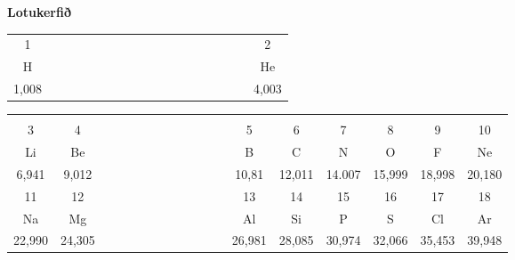 \documentclass[border=1pt,tikz,landscape]{standalone}
\begin{document}
\thispagestyle{empty}
\Large
\begin{center}
\textcolor[rgb]{0.15,0.15,0.55}{{\huge \bf \sc \hspace{-1cm} Lotukerfið}\\[-0.3cm]}
\begin{tabular}{|c|p{10.7mm}*{14}{p{9.86mm}}p{12.2mm}|c|}
\cline{1-1}\cline{18-18}
{\small 1} &&&&&&&&&&&&&&&&& \small 2\\[-1mm]
H &&&&&&&&&&&&&&&&& He\\[-2mm]
\small \hspace{1.6mm}1,008\hspace{1.65mm} &&&&&&&&&&&&&&&&& \small \hspace{1.55mm}4,003\hspace{2.25mm}\\\cline{1-2}\cline{13-18}
\end{tabular}
\begin{tabular}{|c|c|p{17.8mm}*{9}{p{8.98mm}}|c|c|c|c|c|c|}
&&&&&&&&&&&&&&&&&\\[-6.6mm]
\small 3 & \small 4 &&&&&&&&&&& \small 5 & \small 6 & \small 7 & \small 8 & \small 9 & \small 10\\[-1mm]
Li & Be &&&&&&&&&&& B & C & N & O & F & Ne\\[-2mm]
\small 6,941 & \small 9,012\hspace{0.5mm} &&&&&&&&&&& \small 10,81 & \small 12,011 & \small 14.007  & \small 15,999& \small 18,998 & \small 20,180 \\[-1mm]\cline{1-2}\cline{13-18}
\small 11 & \small 12 &&&&&&&&&&& \small 13 & \small 14 & \small 15 & \small 16 & \small 17 & \small 18\\[-1mm]
Na & Mg &&&&&&&&&&& Al & Si & P& S & Cl& Ar\\[-2mm]
\small \hspace{0.75mm}22,990\hspace{0.8mm} & \small \hspace{0.83mm}24,305\hspace{0.83mm} &&&&&&&&&&& \small \hspace{0.8mm}26,981\hspace{0.78mm} & \small \hspace{0.95mm}28,085\hspace{0.73mm} & \small \hspace{0.8mm}30,974\hspace{0.8mm}  & \small 32,066 & \small \hspace{0.8mm}35,453\hspace{0.8mm} & \small 39,948\\

\end{tabular}
\end{center}
\end{document}
